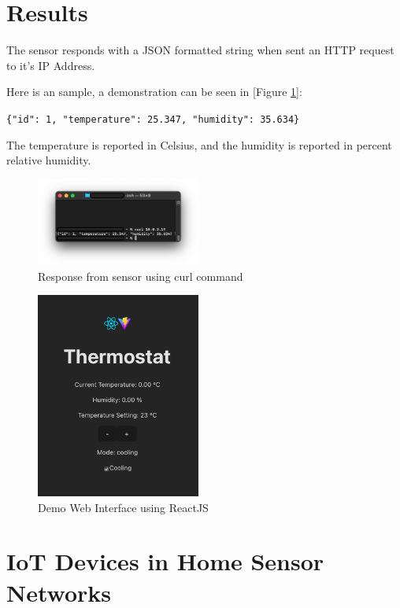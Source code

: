 \documentclass[10pt, journal]{IEEEtran} %
\begin{document}
\section{Results}

The sensor responds with a JSON formatted string when sent an HTTP request to it's IP Address.

Here is an sample, a demonstration can be seen in [Figure \ref{fig:sensor_response}]:

\lstinline[basicstyle=\footnotesize]|{"id": 1, "temperature": 25.347, "humidity": 35.634}|

The temperature is reported in Celsius, and the humidity is reported in percent relative humidity.

\begin{figure}[htbp]
    \centering
    \includegraphics[width=0.48\textwidth]{images/sensor_response.png}
    \caption{Response from sensor using curl command}
    \label{fig:sensor_response}
\end{figure}


\begin{figure}[htbp]
    \centering
    \includegraphics[width=0.48\textwidth]{images/DemoWebInterface.png}
    \caption{Demo Web Interface using ReactJS}
    \label{fig:npmweb}
\end{figure}


\section{IoT Devices in Home Sensor Networks}
\end{document}

